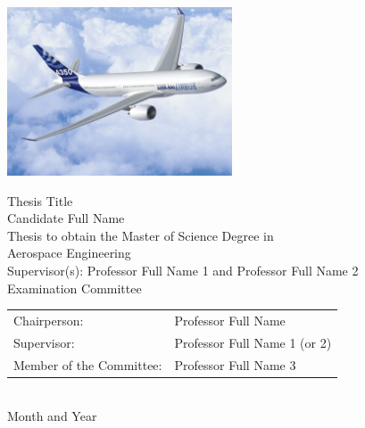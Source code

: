 \begin{center}
%
\vspace{2.5cm}
\includegraphics[height=50mm]{Figures/Airbus_A350.jpg}

\vspace{1.0cm}
{\FontLb Thesis Title} \\
\vspace{2.7cm}
{\FontMb Candidate Full Name} \\
\vspace{2.0cm}
{\FontSn Thesis to obtain the Master of Science Degree in} \\
\vspace{0.3cm}
{\FontLb Aerospace Engineering} \\
\vspace{1.1cm}
{\FontSn Supervisor(s): Professor Full Name 1 and Professor Full Name 2} \\
\vspace{1.1cm}
{\FontMb Examination Committee} \\
\vspace{0.3cm}
{\FontSn %
\begin{tabular}{ll}
Chairperson: & Professor Full Name \\
Supervisor: & Professor Full Name 1 (or 2) \\
Member of the Committee: & Professor Full Name 3
\end{tabular} } \\
\vspace{1.5cm}
{\FontMb Month and Year} \\
%
\end{center}

\cleardoublepage

